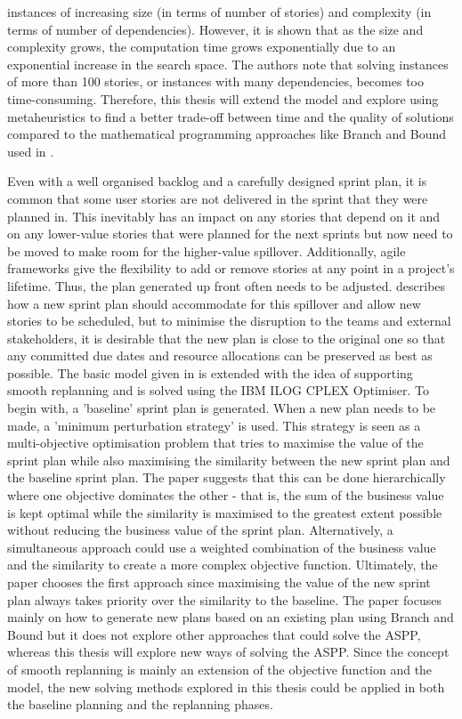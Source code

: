 instances of increasing size (in terms of number of stories) and complexity (in terms of number of dependencies). However, it is shown that as the size and complexity grows, the computation time grows exponentially due to an exponential increase in the search space. The authors note that solving instances of more than 100 stories, or instances with many dependencies, becomes too time-consuming. Therefore, this thesis will extend the model and explore using metaheuristics to find a better trade-off between time and the quality of solutions compared to the mathematical programming approaches like Branch and Bound used in \citet{golfarelli2012sprint}.

Even with a well organised backlog and a carefully designed sprint plan, it is common that some user stories are not delivered in the sprint that they were planned in. This inevitably has an impact on any stories that depend on it and on any lower-value stories that were planned for the next sprints but now need to be moved to make room for the higher-value spillover. Additionally, agile frameworks give the flexibility to add or remove stories at any point in a project's lifetime. Thus, the plan generated up front often needs to be adjusted. \citet{golfarelli2013multi} describes how a new sprint plan should accommodate for this spillover and allow new stories to be scheduled, but to minimise the disruption to the teams and external stakeholders, it is desirable that the new plan is close to the original one so that any committed due dates and resource allocations can be preserved as best as possible. The basic model given in \citet{golfarelli2012sprint} is extended with the idea of supporting smooth replanning and is solved using the IBM ILOG CPLEX Optimiser. To begin with, a 'baseline' sprint plan is generated. When a new plan needs to be made, a 'minimum perturbation strategy' is used. This strategy is seen as a multi-objective optimisation problem that tries to maximise the value of the sprint plan while also maximising the similarity between the new sprint plan and the baseline sprint plan. The paper suggests that this can be done hierarchically where one objective dominates the other - that is, the sum of the business value is kept optimal while the similarity is maximised to the greatest extent possible without reducing the business value of the sprint plan. Alternatively, a simultaneous approach could use a weighted combination of the business value and the similarity to create a more complex objective function. Ultimately, the paper chooses the first approach since maximising the value of the new sprint plan always takes priority over the similarity to the baseline. The paper focuses mainly on how to generate new plans based on an existing plan using Branch and Bound but it does not explore other approaches that could solve the ASPP, whereas this thesis will explore new ways of solving the ASPP. Since the concept of smooth replanning is mainly an extension of the objective function and the model, the new solving methods explored in this thesis could be applied in both the baseline planning and the replanning phases.

